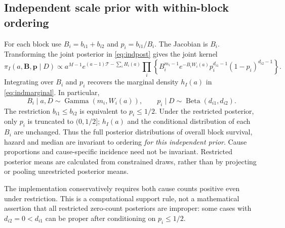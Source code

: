 \documentclass[a4paper,11pt]{article}
\begin{document}
\subsection{Independent scale prior with within-block ordering}\label{sec:bayes-independent-restricted}
For each block use $B_i=b_{i1}+b_{i2}$ and $p_i=b_{i1}/B_i$. The Jacobian is $B_i$. Transforming the joint posterior in \eqref{eq:indpost} gives the joint kernel
\begin{equation}\label{eq:betagamma}
\pi_I(a,\mathbf B,\mathbf p\mid D)\propto a^{M-1}e^{(a-1)\mathcal{T}-\sum_iH_i(a)}\prod_i\left\{B_i^{m_i-1}e^{-B_iW_i(a)}p_i^{d_{i1}-1}(1-p_i)^{d_{i2}-1}\right\}.
\end{equation}
Integrating over $B_i$ and $p_i$ recovers the marginal density $h_I(a)$ in \eqref{eq:indmarginal}. In particular,
\begin{equation}\label{eq:betagamma-draw}
B_i\mid a,D\sim\operatorname{Gamma}(m_i,W_i(a)),\qquad p_i\mid D\sim\operatorname{Beta}(d_{i1},d_{i2}).
\end{equation}
The restriction $b_{i1}\le b_{i2}$ is equivalent to $p_i\le1/2$. Under the restricted posterior, only $p_i$ is truncated to $(0,1/2]$; $h_I(a)$ and the conditional distribution of each $B_i$ are unchanged. Thus the full posterior distributions of overall block survival, hazard and median are invariant to ordering \emph{for this independent prior}. Cause proportions and cause-specific incidence need not be invariant. Restricted posterior means are calculated from constrained draws, rather than by projecting or pooling unrestricted posterior means.

The implementation conservatively requires both cause counts positive even under restriction. This is a computational support rule, not a mathematical assertion that all restricted zero-count posteriors are improper: some cases with $d_{i2}=0<d_{i1}$ can be proper after conditioning on $p_i\le1/2$.
\end{document}
